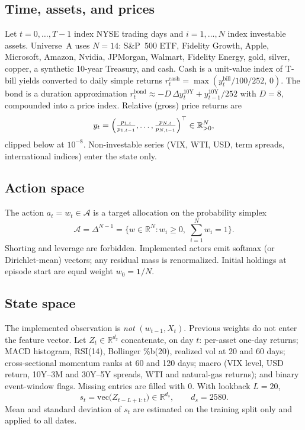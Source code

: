 \documentclass[11pt]{article}
\begin{document}
\subsection{Time, assets, and prices}
Let $t=0,\ldots,T-1$ index NYSE trading days and $i=1,\ldots,N$ index investable assets. Universe~A uses $N=14$:
S\&P~500 ETF, Fidelity Growth, Apple, Microsoft, Amazon, Nvidia, JPMorgan, Walmart, Fidelity Energy, gold, silver, copper, a synthetic 10-year Treasury, and cash.
Cash is a unit-value index of T-bill yields converted to daily simple returns $r^{\mathrm{cash}}_t = \max(y^{\mathrm{bill}}_t/100/252,\,0)$. The bond is a duration approximation $r^{\mathrm{bond}}_t \approx -D\,\Delta y^{10\mathrm{Y}}_t + y^{10\mathrm{Y}}_{t-1}/252$ with $D=8$, compounded into a price index. Relative (gross) price returns are
\begin{equation}
  y_t = \Bigl( \tfrac{p_{1,t}}{p_{1,t-1}},\ldots,\tfrac{p_{N,t}}{p_{N,t-1}} \Bigr)^\top \in \mathbb{R}^N_{>0},
\end{equation}
clipped below at $10^{-8}$. Non-investable series (VIX, WTI, USD, term spreads, international indices) enter the state only.

\subsection{Action space}
The action $a_t = w_t \in \mathcal{A}$ is a target allocation on the probability simplex
\begin{equation}
  \mathcal{A} = \Delta^{N-1}
  = \bigl\{ w \in \mathbb{R}^N : w_i \ge 0,\; \textstyle\sum_{i=1}^N w_i = 1 \bigr\}.
\end{equation}
Shorting and leverage are forbidden. Implemented actors emit softmax (or Dirichlet-mean) vectors; any residual mass is renormalized. Initial holdings at episode start are equal weight $w_0 = \mathbf{1}/N$.

\subsection{State space}
The implemented observation is \emph{not} $(w_{t-1}, X_t)$. Previous weights do not enter the feature vector. Let $Z_t \in \mathbb{R}^{d_z}$ concatenate, on day $t$:
per-asset one-day returns; MACD histogram, RSI(14), Bollinger \%b(20), realized vol at 20 and 60 days; cross-sectional momentum ranks at 60 and 120 days; macro (VIX level, USD return, 10Y--3M and 30Y--5Y spreads, WTI and natural-gas returns); and binary event-window flags. Missing entries are filled with 0. With lookback $L=20$,
\begin{equation}
  s_t = \mathrm{vec}\bigl(Z_{t-L+1:t}\bigr) \in \mathbb{R}^{d_s},\qquad d_s = 2580.
\end{equation}
Mean and standard deviation of $s_t$ are estimated on the training split only and applied to all dates.
\end{document}
